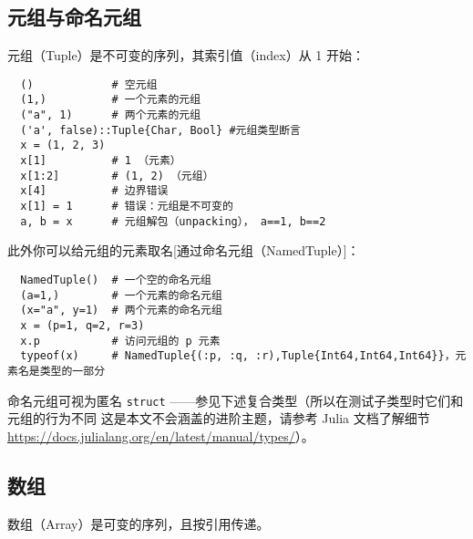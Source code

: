 \documentclass[10pt,a4paper]{article}
\begin{document}
\subsection{元组与命名元组}
元组（Tuple）是不可变的序列，其索引值（index）从 1 开始：
\begin{lstlisting}
  ()            # 空元组
  (1,)          # 一个元素的元组
  ("a", 1)      # 两个元素的元组
  ('a', false)::Tuple{Char, Bool} #元组类型断言
  x = (1, 2, 3)
  x[1]          # 1 （元素）
  x[1:2]        # (1, 2) （元组）
  x[4]          # 边界错误
  x[1] = 1      # 错误：元组是不可变的
  a, b = x      # 元组解包（unpacking）， a==1, b==2
\end{lstlisting}
此外你可以给元组的元素取名[通过命名元组（NamedTuple）]：
\begin{lstlisting}
  NamedTuple()  # 一个空的命名元组
  (a=1,)        # 一个元素的命名元组
  (x="a", y=1)  # 两个元素的命名元组
  x = (p=1, q=2, r=3)
  x.p           # 访问元组的 p 元素
  typeof(x)     # NamedTuple{(:p, :q, :r),Tuple{Int64,Int64,Int64}}，元素名是类型的一部分
\end{lstlisting}
命名元组可视为匿名 \lstinline|struct| ——参见下述复合类型（所以在测试子类型时它们和元组的行为不同
这是本文不会涵盖的进阶主题，请参考 Julia 文档了解细节\sloppy   \url{https://docs.julialang.org/en/latest/manual/types/}）。

\subsection{数组}
数组（Array）是可变的序列，且按引用传递。
\end{document}
